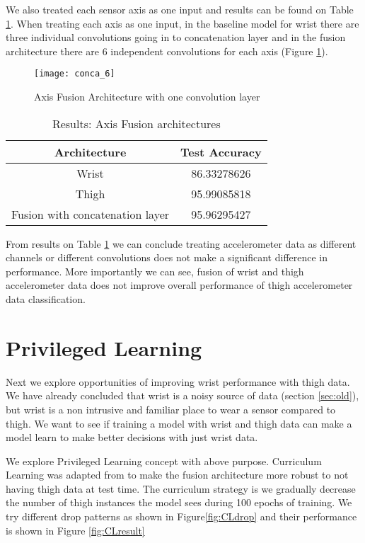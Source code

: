 We also treated each sensor axis as one input and results can be found on Table \ref{table:fusion2}. When treating each axis as one input, in the baseline model for wrist there are three individual convolutions going in to concatenation layer and in the fusion architecture there are 6 independent convolutions for each axis (Figure \ref{fig:channelconcat}).  

\begin{figure}[!ht]
\centering
\texttt{[image: conca\_6]}
\caption{Axis Fusion Architecture with one convolution layer}
\label{fig:channelconcat}
\end{figure}

\begin{table}[!ht]
\caption{Results: Axis Fusion architectures }
\label{table:fusion2}
\begin{center}
\begin{tabular}{|c|c|} 
  \hline
  Architecture & Test Accuracy \\
  \hline
  Wrist & 86.33278626 \\
  \hline
  Thigh & 95.99085818 \\
  \hline
  Fusion with concatenation layer & 95.96295427 \\
  \hline
\end{tabular}
\end{center}
\end{table}

From results on Table \ref{table:fusion2} we can conclude treating accelerometer data as different channels or different convolutions does not make a significant difference in performance. More importantly we can see, fusion of wrist and thigh accelerometer data does not improve overall performance of thigh accelerometer data classification.

\section*{Privileged Learning}
Next we explore opportunities of improving wrist performance with thigh data. We have already concluded that wrist is a noisy source of data (section \ref{sec:old}), but wrist is a non intrusive and familiar place to wear a sensor compared to thigh. We want to see if training a model with wrist and thigh data can make a model learn to make better decisions with just wrist data. 

We explore Privileged Learning concept with above purpose. Curriculum Learning was adapted from  to make the fusion architecture more robust to not having thigh data at test time. The curriculum strategy is we gradually decrease the number of thigh instances the model sees during 100 epochs of training. We try different drop patterns as shown in Figure\ref{fig:CLdrop} and their performance is shown in Figure \ref{fig:CLresult}

